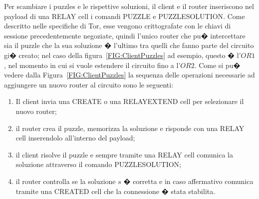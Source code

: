 Per scambiare i puzzles e le rispettive soluzioni, il client e il router inseriscono nel payload di una {\ttfamily RELAY} cell i comandi {\ttfamily PUZZLE} e {\ttfamily PUZZLE\textunderscore SOLUTION}. Come descritto nelle specifiche di Tor, esse vengono crittografate con le chiavi di sessione precedentemente negoziate, quindi l'unico router che pu� intercettare sia il puzzle che la sua soluzione � l'ultimo tra quelli che fanno parte del circuito gi� creato; nel caso della figura~\ref{FIG:ClientPuzzles} ad esempio, questo � l'$OR1$, nel momento in cui si vuole estendere il circuito fino a l'$OR2$. 
Come si pu� vedere dalla Figura~\ref{FIG:ClientPuzzles} la sequenza delle operazioni necessarie ad aggiungere un nuovo router al circuito sono le seguenti:
\begin{enumerate}
\item Il client invia una {\ttfamily CREATE} o una  {\ttfamily RELAY\textunderscore EXTEND} cell per selezionare il nuovo router;
\item il router crea il puzzle, memorizza la soluzione e risponde con una {\ttfamily RELAY} cell inserendolo all'interno del payload;
\item il client risolve il puzzle e sempre tramite una {\ttfamily RELAY} cell comunica la soluzione attraverso il comando {\ttfamily PUZZLE\textunderscore SOLUTION};
\item il router controlla se la soluzione $s$ � corretta e in caso affermativo comunica tramite una {\ttfamily CREATED} cell che la connessione � stata stabilita.
\end{enumerate}
